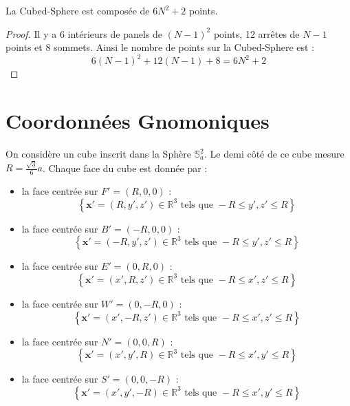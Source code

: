 \begin{proposition}
La Cubed-Sphere est composée de $6N^2 +2$ points.
\end{proposition}

\begin{proof}
Il y a 6 intérieurs de panels de $(N-1)^2$ points, 12 arrêtes de $N-1$ points et 8 sommets. Ainsi le nombre de points sur la Cubed-Sphere est :
$$
6 (N-1)^2 + 12 (N-1)+8=6N^2+2
$$
\end{proof}











\section{Coordonnées Gnomoniques}

On considère un cube inscrit dans la Sphère $\mathbb{S}_a^2$. Le demi côté de ce cube mesure $R=\frac{\sqrt{3}}{6}a$. Chaque face du cube est donnée par :
\begin{itemize}
\item la face centrée sur $F'=(R,0,0)$ : 
\begin{equation}
\left\lbrace
\mathbf{x}' = (R,y',z') \in \mathbb{R}^3 \text{ tels que } -R  \leq y',z' \leq R
\right\rbrace
\end{equation}

\item la face centrée sur $B'=(-R,0,0)$ : 
\begin{equation}
\left\lbrace
\mathbf{x}' = (-R,y',z') \in \mathbb{R}^3 \text{ tels que } -R  \leq y',z' \leq R
\right\rbrace
\end{equation}

\item la face centrée sur $E'=(0,R,0)$ : 
\begin{equation}
\left\lbrace
\mathbf{x}' = (x',R,z') \in \mathbb{R}^3 \text{ tels que } -R  \leq x',z' \leq R
\right\rbrace
\end{equation}

\item la face centrée sur $W'=(0,-R,0)$ : 
\begin{equation}
\left\lbrace
\mathbf{x}' = (x',-R,z') \in \mathbb{R}^3 \text{ tels que } -R  \leq x',z' \leq R
\right\rbrace
\end{equation}

\item la face centrée sur $N'=(0,0,R)$ : 
\begin{equation}
\left\lbrace
\mathbf{x}' = (x',y',R) \in \mathbb{R}^3 \text{ tels que } -R  \leq x',y' \leq R
\right\rbrace
\end{equation}

\item la face centrée sur $S'=(0,0,-R)$ : 
\begin{equation}
\left\lbrace
\mathbf{x}' = (x',y',-R) \in \mathbb{R}^3 \text{ tels que } -R  \leq x',y' \leq R
\right\rbrace
\end{equation}
\end{itemize}

